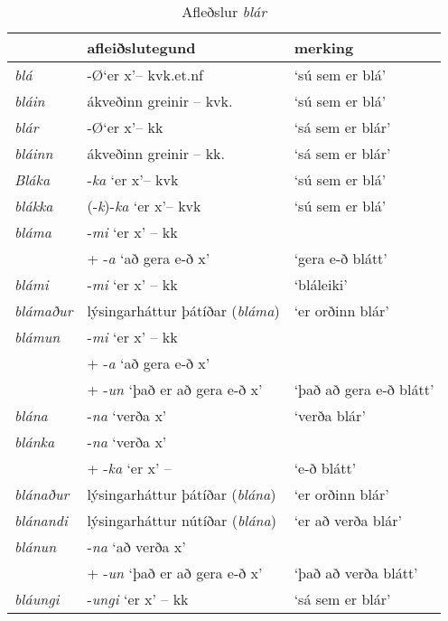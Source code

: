 \documentclass[../samsetningasafn.tex]{subfiles}
\begin{document}
\begin{table}[ht!]%
\begin{footnotesize}
\begin{tcolorbox}
	\begin{center}
	\begin{tabularx}{\textwidth}{lll}
						&	\textbf{afleiðslutegund}					&	\textbf{merking}	\\
	\hline
	\textit{blá}			&	-\O \lq er x\rq -- kvk.et.nf					&	\lq sú sem er blá\rq	\\
	\textit{bláin}			&	ákveðinn greinir -- kvk.					&	\lq sú sem er blá\rq	\\
	\textit{blár}			&	-\O \lq er x\rq -- kk						&	\lq sá sem er blár\rq		\\
	\textit{bláinn}		&	ákveðinn greinir -- kk.					&	\lq sá sem er blár\rq	\\
	\textit{Bláka}		&	-\textit{ka} \lq er x\rq -- kvk 				&	\lq sú sem er blá\rq	\\
	\textit{blákka}		&	(-\textit{k})-\textit{ka} \lq er x\rq -- kvk 		&	\lq sú sem er blá\rq	\\
	\textit{bláma}		&	-\textit{mi} \lq er x\rq{} -- kk 				&					\\
					&	+ -\textit{a} \lq að gera e-ð x\rq				&	\lq gera e-ð blátt\rq	\\
	\textit{blámi}		&	-\textit{mi} \lq er x\rq{} -- kk 				&	\lq bláleiki\rq	\\
	\textit{blámaður}		&	lýsingarháttur þátíðar (\textit{bláma})			&	\lq er orðinn blár\rq	\\
	\textit{blámun}		&	-\textit{mi} \lq er x\rq{} -- kk 				&				\\
					&	+ -\textit{a} \lq að gera e-ð x\rq{} 			&				\\
					&	+ -\textit{un} \lq það er að gera e-ð x\rq		&	\lq það að gera e-ð blátt\rq	\\
	\textit{blána}		&	-\textit{na} \lq verða x\rq					&	\lq verða blár\rq	\\
	\textit{blánka}		&	-\textit{na} \lq verða x\rq{} 				&				\\
					&	+ -\textit{ka} \lq er x\rq{} -- 				&	\lq e-ð blátt\rq	\\
	\textit{blánaður}		&	lýsingarháttur þátíðar (\textit{blána})			&	\lq er orðinn blár\rq	\\
	\textit{blánandi}		&	lýsingarháttur nútíðar (\textit{blána})			&	\lq er að verða blár\rq	\\
	\textit{blánun}		&	-\textit{na} \lq að verða x\rq{} 				&				\\
					&	+ -\textit{un} \lq það er að gera e-ð x\rq		&	\lq það að verða blátt\rq	\\
	\textit{bláungi}		&	-\textit{ungi} \lq er x\rq{} -- kk				&	\lq sá sem er blár\rq		\\
	\end{tabularx}
	\end{center}
\end{tcolorbox}
\end{footnotesize}
	\caption{Afleðslur \textit{blár}}
	\label{tafla:blafl}
\end{table}

\clearpage
\end{document}
